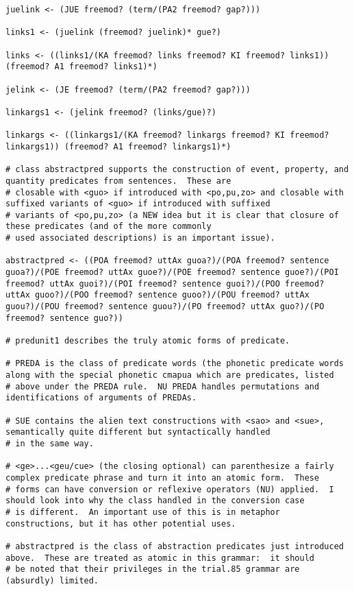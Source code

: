 \documentclass{article}
\begin{document}
\begin{verbatim}
juelink <- (JUE freemod? (term/(PA2 freemod? gap?)))

links1 <- (juelink (freemod? juelink)* gue?)

links <- ((links1/(KA freemod? links freemod? KI freemod? links1)) (freemod? A1 freemod? links1)*)

jelink <- (JE freemod? (term/(PA2 freemod? gap?)))

linkargs1 <- (jelink freemod? (links/gue)?)

linkargs <- ((linkargs1/(KA freemod? linkargs freemod? KI freemod? linkargs1)) (freemod? A1 freemod? linkargs1)*)

# class abstractpred supports the construction of event, property, and quantity predicates from sentences.  These are
# closable with <guo> if introduced with <po,pu,zo> and closable with suffixed variants of <guo> if introduced with suffixed
# variants of <po,pu,zo> (a NEW idea but it is clear that closure of these predicates (and of the more commonly
# used associated descriptions) is an important issue).

abstractpred <- ((POA freemod? uttAx guoa?)/(POA freemod? sentence guoa?)/(POE freemod? uttAx guoe?)/(POE freemod? sentence guoe?)/(POI freemod? uttAx guoi?)/(POI freemod? sentence guoi?)/(POO freemod? uttAx guoo?)/(POO freemod? sentence guoo?)/(POU freemod? uttAx guou?)/(POU freemod? sentence guou?)/(PO freemod? uttAx guo?)/(PO freemod? sentence guo?))

# predunit1 describes the truly atomic forms of predicate.

# PREDA is the class of predicate words (the phonetic predicate words along with the special phonetic cmapua which are predicates, listed
# above under the PREDA rule.  NU PREDA handles permutations and identifications of arguments of PREDAs.

# SUE contains the alien text constructions with <sao> and <sue>, semantically quite different but syntactically handled
# in the same way.

# <ge>...<geu/cue> (the closing optional) can parenthesize a fairly complex predicate phrase and turn it into an atomic form.  These
# forms can have conversion or reflexive operators (NU) applied.  I should look into why the class handled in the conversion case
# is different.  An important use of this is in metaphor constructions, but it has other potential uses.

# abstractpred is the class of abstraction predicates just introduced above.  These are treated as atomic in this grammar:  it should
# be noted that their privileges in the trial.85 grammar are (absurdly) limited.


\end{verbatim}
\end{document}
